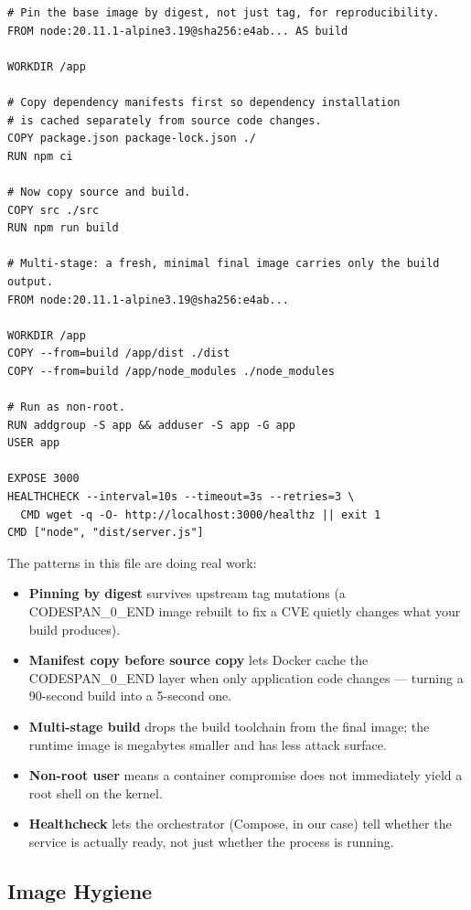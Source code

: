 \documentclass[11pt,a4paper]{book}
\begin{document}
\begin{lstlisting}
# Pin the base image by digest, not just tag, for reproducibility.
FROM node:20.11.1-alpine3.19@sha256:e4ab... AS build

WORKDIR /app

# Copy dependency manifests first so dependency installation
# is cached separately from source code changes.
COPY package.json package-lock.json ./
RUN npm ci

# Now copy source and build.
COPY src ./src
RUN npm run build

# Multi-stage: a fresh, minimal final image carries only the build output.
FROM node:20.11.1-alpine3.19@sha256:e4ab...

WORKDIR /app
COPY --from=build /app/dist ./dist
COPY --from=build /app/node_modules ./node_modules

# Run as non-root.
RUN addgroup -S app && adduser -S app -G app
USER app

EXPOSE 3000
HEALTHCHECK --interval=10s --timeout=3s --retries=3 \
  CMD wget -q -O- http://localhost:3000/healthz || exit 1
CMD ["node", "dist/server.js"]
\end{lstlisting}

The patterns in this file are doing real work:

\begin{itemize}
  \item \textbf{Pinning by digest} survives upstream tag mutations (a CODESPAN\_0\_END image rebuilt to fix a CVE quietly changes what your build produces).
  \item \textbf{Manifest copy before source copy} lets Docker cache the CODESPAN\_0\_END layer when only application code changes --- turning a 90-second build into a 5-second one.
  \item \textbf{Multi-stage build} drops the build toolchain from the final image; the runtime image is megabytes smaller and has less attack surface.
  \item \textbf{Non-root user} means a container compromise does not immediately yield a root shell on the kernel.
  \item \textbf{Healthcheck} lets the orchestrator (Compose, in our case) tell whether the service is actually ready, not just whether the process is running.
\end{itemize}

\subsection{Image Hygiene}
\end{document}
